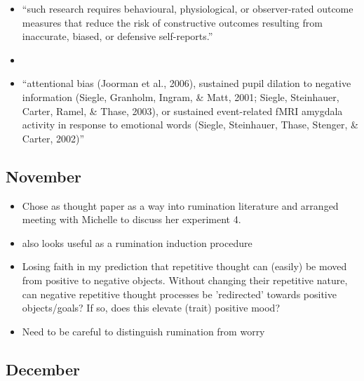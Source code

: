\documentclass[british]{article}
\begin{document}
\begin{itemize}
  \item \enquote{such research requires behavioural, physiological, or
    observer-rated outcome measures that reduce the risk of constructive
  outcomes resulting from inaccurate, biased, or defensive self-reports.}
  \parencite{watkins_constructive_2008}

  \item \textcite{csikszentmihalyi_validity_1987}

  \item \enquote{attentional bias (Joorman et al., 2006), sustained pupil
      dilation to negative information (Siegle, Granholm, Ingram, \&
      Matt, 2001; Siegle, Steinhauer, Carter, Ramel, \& Thase, 2003),
      or sustained event-related fMRI amygdala activity in response to
      emotional words (Siegle, Steinhauer, Thase, Stenger, \& Carter, 2002)}
    \parencite{watkins_constructive_2008}
\end{itemize}

\subsection{November}

\begin{itemize}
  \item Chose \textcite{tester-jones_role_2014} as thought paper as a
  way into rumination literature and arranged meeting with Michelle to
  discuss her experiment 4.

  \item \textcite{roberts_cueing_2013} also looks useful as a rumination induction procedure

  \item Losing faith in my prediction that repetitive thought can
  (easily) be moved from positive to negative objects.  Without changing
  their repetitive nature, can negative repetitive thought processes be
  'redirected' towards positive objects/goals? If so, does this elevate
  (trait) positive mood? \parencite{watkins_constructive_2008}

  \item Need to be careful to distinguish rumination from worry
  \parencite{watkins_comparisons_2005,nolen-hoeksema_rethinking_2008}
\end{itemize}

\subsection{December}
\end{document}
